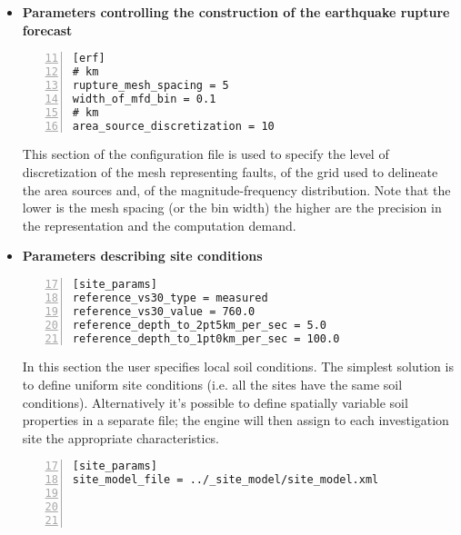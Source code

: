 \begin{itemize}
    In the second option all the possible realisations are created. 
    Below we provide an example for the latter option.
    In this example we set the \texttt{number\-\_of\-\_logic\_tree\_samples}
    to 0. \gls{acr:oqe} will perform a complete enumeration of all 
    the possible paths from the roots to the leaves of the logic tree 
    structure. 
\begin{Verbatim}[frame=single, commandchars=\\\{\}, fontsize=\small,
    firstnumber=9, numbers=left, numbersep=2pt]
[logic_tree]
number_of_logic_tree_samples = 0
\end{Verbatim}
    If the seismic source logic tree and the ground motion
    logic tree do not contain epistemic uncertainties the engine will
    create a single PSHA input.
%
\item \textbf{Parameters controlling the construction of the earthquake 
    rupture forecast}
\begin{Verbatim}[frame=single, commandchars=\\\{\}, fontsize=\small,
    firstnumber=11, numbers=left, numbersep=2pt]
[erf]
# km
rupture_mesh_spacing = 5
width_of_mfd_bin = 0.1
# km
area_source_discretization = 10
\end{Verbatim}
This section of the configuration file is used to specify the 
level of discretization of the mesh representing faults, of the grid
used to delineate the area sources and, of the magnitude-frequency 
distribution. 
Note that the lower is the mesh spacing (or the bin width) the higher 
are the precision in the representation and the computation demand.
%
\item \textbf{Parameters describing site conditions}
\begin{Verbatim}[frame=single, commandchars=\\\{\}, fontsize=\small,
    firstnumber=17, numbers=left, numbersep=2pt]
[site_params]
reference_vs30_type = measured
reference_vs30_value = 760.0
reference_depth_to_2pt5km_per_sec = 5.0
reference_depth_to_1pt0km_per_sec = 100.0
\end{Verbatim}
In this section the user specifies local soil conditions. The simplest
solution is to define uniform site conditions (i.e. all the sites have 
the same soil conditions). Alternatively it's possible to define 
spatially variable soil properties in a separate file; the engine will
then assign to each investigation site the appropriate characteristics.
%
\begin{Verbatim}[frame=single, commandchars=\\\{\}, fontsize=\small,
    firstnumber=17, numbers=left, numbersep=2pt]
[site_params]
site_model_file = ../_site_model/site_model.xml




\end{Verbatim}
\end{itemize}
